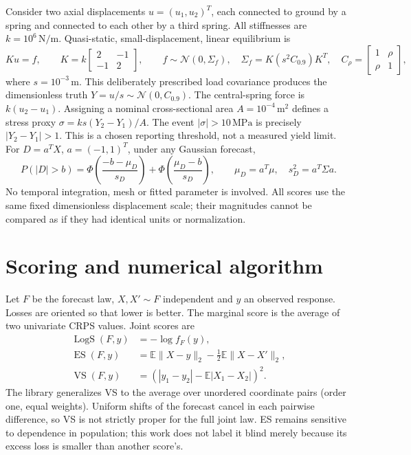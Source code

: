 \documentclass[10pt,a4paper]{article}
\newcommand{\E}{\mathbb E}
\begin{document}
Consider two axial displacements $u=(u_1,u_2)^T$, each connected to ground by
a spring and connected to each other by a third spring. All stiffnesses are
$k=10^6\,\mathrm{N/m}$. Quasi-static, small-displacement, linear equilibrium is
\begin{equation}
 K u=f,\qquad K=k\begin{bmatrix}2&-1\\-1&2\end{bmatrix},\qquad
 f\sim\mathcal N(0,\Sigma_f),\quad
 \Sigma_f=K(s^2 C_{0.9})K^T,\quad
 C_\rho=\begin{bmatrix}1&\rho\\\rho&1\end{bmatrix},
 \label{eq:mechanics}
\end{equation}
where $s=10^{-3}\,\mathrm m$. This deliberately prescribed load covariance
produces the dimensionless truth $Y=u/s\sim\mathcal N(0,C_{0.9})$.
The central-spring force is $k(u_2-u_1)$. Assigning a nominal cross-sectional
area $A=10^{-4}\,\mathrm{m^2}$ defines a stress proxy
$\sigma=k s(Y_2-Y_1)/A$. The event $|\sigma|>10\,\mathrm{MPa}$ is precisely
$|Y_2-Y_1|>1$. This is a chosen reporting threshold, not a measured yield limit.
For $D=a^TX$, $a=(-1,1)^T$, under any Gaussian forecast,
\begin{equation}
 P(|D|>b)=\Phi\!\left(\frac{-b-\mu_D}{s_D}\right)
             +\Phi\!\left(\frac{\mu_D-b}{s_D}\right),\qquad
 \mu_D=a^T\mu,\quad s_D^2=a^T\Sigma a. \label{eq:risk}
\end{equation}
No temporal integration, mesh or fitted parameter is involved. All scores use
the same fixed dimensionless displacement scale; their magnitudes cannot be
compared as if they had identical units or normalization.

\section{Scoring and numerical algorithm}
Let $F$ be the forecast law, $X,X'\sim F$ independent and $y$ an observed
response. Losses are oriented so that lower is better. The marginal score is
the average of two univariate CRPS values. Joint scores are
\begin{align}
 \operatorname{LogS}(F,y)&=-\log f_F(y),\\
 \operatorname{ES}(F,y)&=\E\|X-y\|_2-\tfrac12\E\|X-X'\|_2, \label{eq:es}\\
 \operatorname{VS}(F,y)&=(|y_1-y_2|-\E|X_1-X_2|)^2. \label{eq:vs}
\end{align}
The library generalizes VS to the average over unordered coordinate pairs
(order one, equal weights). Uniform shifts of the forecast cancel in each
pairwise difference, so VS is not strictly proper for the full joint law.
ES remains sensitive to dependence in population; this work does not label it
blind merely because its excess loss is smaller than another score's.
\end{document}
